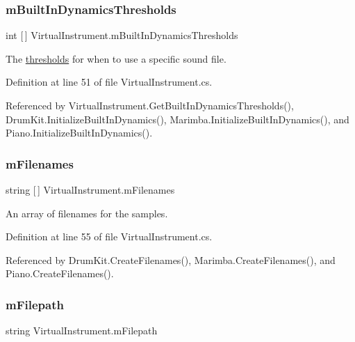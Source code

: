 \subsubsection{\texorpdfstring{m\+Built\+In\+Dynamics\+Thresholds}{mBuiltInDynamicsThresholds}}
{\footnotesize\ttfamily int \mbox{[}$\,$\mbox{]} Virtual\+Instrument.\+m\+Built\+In\+Dynamics\+Thresholds\hspace{0.3cm}{\ttfamily [protected]}}



The \hyperlink{group___audio_DefBIDThresh}{thresholds} for when to use a specific sound file. 



Definition at line 51 of file Virtual\+Instrument.\+cs.



Referenced by Virtual\+Instrument.\+Get\+Built\+In\+Dynamics\+Thresholds(), Drum\+Kit.\+Initialize\+Built\+In\+Dynamics(), Marimba.\+Initialize\+Built\+In\+Dynamics(), and Piano.\+Initialize\+Built\+In\+Dynamics().

\mbox{\label{group___v_i_base_pro_var_gab2add474ca506357688b5dd08cac4cb5}} 
\subsubsection{\texorpdfstring{m\+Filenames}{mFilenames}}
{\footnotesize\ttfamily string \mbox{[}$\,$\mbox{]} Virtual\+Instrument.\+m\+Filenames\hspace{0.3cm}{\ttfamily [protected]}}



An array of filenames for the samples. 



Definition at line 55 of file Virtual\+Instrument.\+cs.



Referenced by Drum\+Kit.\+Create\+Filenames(), Marimba.\+Create\+Filenames(), and Piano.\+Create\+Filenames().

\mbox{\label{group___v_i_base_pro_var_gac428224be859933d720a9c533fdb5643}} 
\subsubsection{\texorpdfstring{m\+Filepath}{mFilepath}}
{\footnotesize\ttfamily string Virtual\+Instrument.\+m\+Filepath\hspace{0.3cm}{\ttfamily [protected]}}



